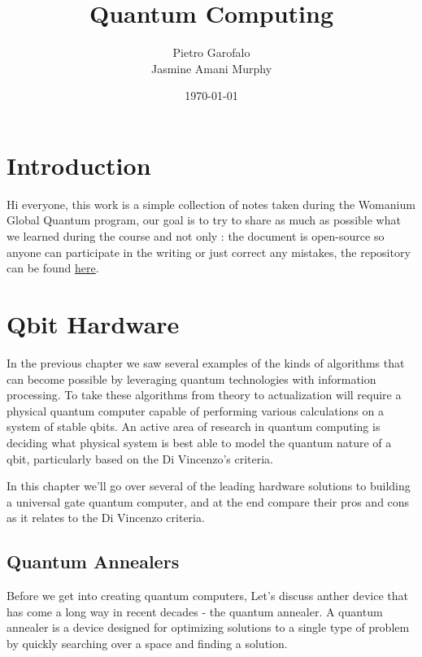\documentclass[a4paper, 12pt, twoside]{report}
\title{Quantum Computing}
\author{Pietro Garofalo \\ Jasmine Amani Murphy}
\date{\today}
\begin{document}
\maketitle
\newpage
\listoftodos
\newpage
\tableofcontents
\newpage

\chapter*{Introduction}
Hi everyone, this work is a simple collection of notes taken during the Womanium Global Quantum program, our goal is to try to share as much as possible what we learned during the course and not only : the document is open-source so anyone can participate in the writing or just correct any mistakes, the repository can be found \href{https://github.com/Jazy1618/Quantum-Notebook}{here}.

\newpage






\chapter{Qbit Hardware}
In the previous chapter we saw several examples of the kinds of algorithms that can become possible by leveraging quantum technologies with information processing. To take these algorithms from theory to actualization will require a physical quantum computer capable of performing various calculations on a system of stable qbits. An active area of research in quantum computing is deciding what physical system is best able to model the quantum nature of a qbit, particularly based on the Di Vincenzo’s criteria.

In this chapter we'll go over several of the leading hardware solutions to building a universal gate quantum computer, and at the end compare their pros and cons as it relates to the Di Vincenzo criteria.

\section{Quantum Annealers}
Before we get into creating quantum computers, Let's discuss anther device that has come a long way in recent decades - the quantum annealer. A quantum annealer is a device designed for optimizing solutions to a single type of problem by quickly searching over a space and finding a solution. 
\end{document}
